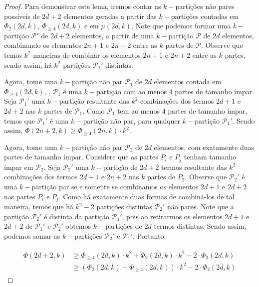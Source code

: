 \documentclass[12pt]{article}
\begin{document}
  \begin{proof}
  	
  Para demonstrar este lema, iremos contar as $k-$partições não pares possíveis de $2d+2$ elementos geradas a partir das $k-$partições contadas em $\Phi_2(2d, k) $, $\Phi_{\geq 4}(2d, k)$ e em $\mu(2d, k)$. Note que podemos formar uma $k-$partição $\mathcal{P}'$ de $2d+2$ elementos, a partir de uma $k-$partição $\mathcal{P}$ de $2d$ elementos, combinando os elementos $2n+1$ e $2n+2$ entre as $k$ partes de $\mathcal{P}$. Observe que temos $k^2$ maneiras de combinar os elementos $2n+1$ e $2n+2$ entre as $k$ partes, sendo assim, há $k^2$ partições $\mathcal{P}_1'$ distintas.
  	
  Agora, tome uma $k-$partição não par $\mathcal{P}_1$ de $2d$ elementos contada em $\Phi_{\geq 4}(2d, k)$, \ie, $\mathcal{P}_1$ é uma $k-$partição com ao menos $4$ partes de tamanho ímpar. Seja $\mathcal{P}_1'$ uma $k-$partição resultante das $k^2$ combinações dos termos $2d+1$ e $2d+2$ nas $k$ partes de $\mathcal{P}_1$. Como $\mathcal{P}_1$ tem ao menos $4$ partes de tamanho ímpar, temos que $\mathcal{P}_1'$ é uma $k-$partição não par, para qualquer $k-$partição $\mathcal{P}_1'$. Sendo assim, $\Phi(2n+2, k) \geq \Phi_{\geq 4}(2n, k) \cdot k^2$.
  
  	Agora, tome uma $k-$partição não par $\mathcal{P}_2$ de $2d$ elementos, com exatamente duas partes de tamanho ímpar. Considere que as partes $P_i$ e $P_j$ tenham tamanho ímpar em $\mathcal{P}_2$. Seja $\mathcal{P}_2'$ uma $k-$partição de $2d+2$ termos resultante das $k^2$ combinações dos termos $2d+1$ e $2n+2$ nas $k$ partes de $P_2$. Observe que $\mathcal{P}_2'$ é uma $k-$partição par se e somente se combinamos os elementos $2d+1$ e $2d+2$ nas partes $P_i$ e $P_j$. Como há exatamente duas formas de combiná-los de tal maneira, temos que há $k^2 - 2$ partições distintas $\mathcal{P}_2'$ não pares.
  	 Note que a partição $\mathcal{P}_2'$ é distinta da partição $\mathcal{P}_1'$, pois ao retirarmos os elementos $2d+1$ e $2d+2$ de $\mathcal{P}_1'$ e $\mathcal{P}_2'$ obtemos $k-$partições de $2d$ termos distintas. Sendo assim, podemos somar as $k-$partições $\mathcal{P}_2'$ e $\mathcal{P}_1'$. Portanto:
   	 
  \begin{align}
  	\begin{split}
  		\Phi(2d+2, k) &\geq \Phi_{\geq 4}(2d, k) \cdot k^2 + \Phi_{2}(2d, k) \cdot k^2 - 2 \cdot \Phi_{2}(2d, k)\\
  		&\geq (\Phi_{2}(2d, k) + \Phi_{\geq 4}(2d, k)) \cdot k^2 - 2 \cdot \Phi_{2}(2d, k)
  	\end{split} 
  \end{align}  
   

\end{proof}
\end{document}
